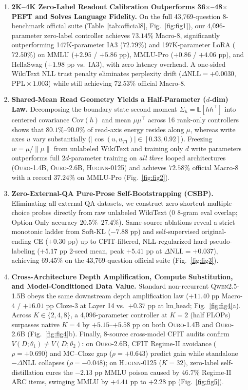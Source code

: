 \documentclass[10pt,twocolumn]{article}
\begin{document}
\begin{enumerate}
\item \textbf{2K--4K Zero-Label Readout Calibration Outperforms 36$\times$--48$\times$ PEFT and Solves Language Fidelity.}
On the full 43,769-question 8-benchmark official suite (Table~\ref{tab:official8}, Fig.~\ref{fig:fig1}), our 4,096-parameter zero-label controller achieves $73.14\%$ Macro-8, significantly outperforming 147K-parameter IA3 ($72.79\%$) and 197K-parameter LoRA ($72.50\%$) on MMLU ($+2.95$ / $+5.86$ pp), MMLU-Pro ($+0.86$ / $+4.06$ pp), and HellaSwag ($+1.98$ pp vs.\ IA3), with zero latency overhead. A one-sided WikiText NLL trust penalty eliminates perplexity drift ($\Delta\mathrm{NLL}=+0.0030$, $\mathrm{PPL}\times 1.003$) while still achieving $72.53\%$ official Macro-8.
\item \textbf{Shared-Mean Read Geometry Yields a Half-Parameter ($d$-dim) Law.}
Decomposing the boundary state second moment $\Sigma_h=\mathbb{E}[hh^\top]$ into centered covariance $\mathrm{Cov}(h)$ and mean $\mu\mu^\top$ across 16 rank-only controllers shows that $80.1\%$--$90.0\%$ of read-axis energy resides along $\mu$, whereas write axes $u$ vary substantially ($|\cos(u,u_{T1})|\in[0.33,0.92]$). Freezing $w=\mu/\|\mu\|$ from unlabeled WikiText and training only $d$ write parameters outperforms full $2d$-parameter training on \emph{all three} looped architectures (\textsc{Ouro-1.4B}, \textsc{Ouro-2.6B}, \textsc{Huginn-0125}) and achieves $72.58\%$ official Macro-8 with a record $37.24\%$ on MMLU-Pro (Fig.~\ref{fig:fig2}).
\item \textbf{Zero-External-QA Pure-Prose Self-Bootstrapping (CSBP).}
Eliminating all external QA datasets, we construct zero-shortcut multiple-choice probes directly from raw unlabeled WikiText (0 8-gram eval overlap; Option-Only accuracy $20.5\%$--$27.4\%$). Same-source ablations reveal a strict monotonic ladder from Soft-KL ($-7.88$ pp) and self-supervised original-ending CE ($+0.30$ pp) up to CFIT-filtered, NLL-regularized hard pseudo-labeling ($+5.17$ pp 2-seed mean, peak $+5.41$ pp at $\Delta\mathrm{NLL}=+0.037$), achieving $69.45\%$ on the 43,769-question official suite (Fig.~\ref{fig:fig3}).
\item \textbf{Cross-Architecture Depth Amplification, Compute Substitution, and Model-Conditioned Data Value.}
Standard non-recurrent \textsc{Qwen2.5-1.5B} obeys the same downstream depth amplification law ($+11.40$ pp Macro-4 / $+16.01$ pp Cloze-3 at Layer 14 vs.\ $+0.37$ pp at $\mathrm{lm\_head}$; Fig.~\ref{fig:fig4}a). Across $K\in\{2,4,8\}$, a 4,096-parameter controller at $K=2$ (half FLOPs) surpasses native $K=4$ by $+5.15$--$+5.58$ pp on both \textsc{Ouro-1.4B} and \textsc{Ouro-2.6B} (Fig.~\ref{fig:fig4}b). Finally, 8-source cross-model CFIT audits confirm $V(D;\theta_1)\neq V(D;\theta_2)$: on \textsc{Ouro-2.6B}, CFIT Regime-II avoidance ($\rho=+0.690$) and MC--Cloze gap ($\rho=+0.643$) predict gain while standalone $-\Delta\mathrm{NLL}$ collapses ($\rho=-0.048$); on \textsc{Huginn-0125} ($K=32$), zero-label self-distillation cures the $-2.13$ pp MMLU poison caused by $46.7\%$ Regime-II ARC items, swinging MMLU by $+4.41$ pp to $+2.28$ pp (Fig.~\ref{fig:fig5}).
\end{enumerate}
\end{document}
